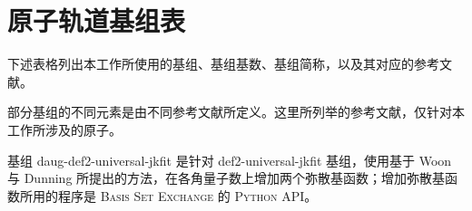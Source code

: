 
\chapter{原子轨道基组表}

下述表格列出本工作所使用的基组、基组基数、基组简称，以及其对应的参考文献。

部分基组的不同元素是由不同参考文献所定义。这里所列举的参考文献，仅针对本工作所涉及的原子。

基组 daug-def2-universal-jkfit 是针对 def2-universal-jkfit 基组，使用基于 Woon 与 Dunning 所提出的方法\cite{Woon-Dunning.JCP.1994}，在各角量子数上增加两个弥散基函数；增加弥散基函数所用的程序是 \textsc{Basis Set Exchange} 的 \textsc{Python} API\cite{Feller-Feller.JCC.1996, Schuchardt-Windus.JCIM.2007, Pritchard-Windus.JCIM.2019}。

\begingroup
\setlength{\LTleft}{-20cm plus -1fill}
\setlength{\LTright}{\LTleft}

